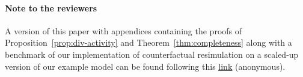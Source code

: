 \ifreview
\ifincludeappendices
\else
\paragraph{Note to the reviewers}
A version of this paper with appendices containing the proofs of
Proposition~\ref{prop:div-activity} and Theorem~\ref{thm:completeness}
along with a benchmark of our implementation of counterfactual
resimulation on a scaled-up version of our example model can be found
following this
\underline{\href{https://www.dropbox.com/sh/2fwji0its0o0ciq/AABfLZ-GO2wCE2x3h3ulUbB-a?dl=0}{link}}
(anonymous).
\fi
\fi